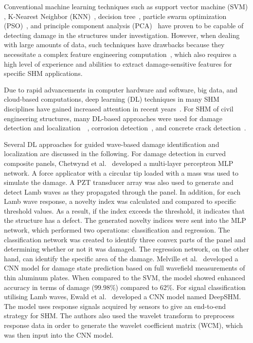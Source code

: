 \documentclass[runningheads]{llncs}
\begin{document}
Conventional machine learning techniques such as support vector machine (SVM) \cite{noori2010application}, K-Nearest Neighbor (KNN)~\cite{Vitola2017}, decision tree~\cite{Mariniello2020}, particle swarm optimization (PSO)~\cite{Khatir2018}, and principle component analysis (PCA)~\cite{wang2014principal} have proven to be capable of detecting damage in the structures under investigation.
However, when dealing with large amounts of data, such techniques have drawbacks because they necessitate a complex feature engineering computation~\cite{Gulgec2019}, which also requires a high level of experience and abilities to extract damage-sensitive features for specific SHM applications.

Due to rapid advancements in computer hardware and software, big data, and cloud-based computations, deep learning (DL) techniques in many SHM disciplines have gained increased attention in recent years~\cite{Azimi}.
For SHM of civil engineering structures, many DL-based approaches were used for damage detection and localization~\cite{Cha2018}~\cite{Kong2018}, corrosion detection~\cite{Atha2018}, and concrete crack detection~\cite{Dung2019}.

Several DL approaches for guided wave-based damage identification and localization are discussed in the following.
For damage detection in curved composite panels, Chetwynd et al.~\cite{Chetwynd2008} developed a multi-layer perceptron MLP network.
A force applicator with a circular tip loaded with a mass was used to simulate the damage.
A PZT transducer array was also used to generate and detect Lamb waves as they propagated through the panel.
In addition, for each Lamb wave response, a novelty index was calculated and compared to specific threshold values.
As a result, if the index exceeds the threshold, it indicates that the structure has a defect.
The generated novelty indices were sent into the MLP network, which performed two operations: classification and regression.
The classification network was created to identify three convex parts of the panel and determining whether or not it was damaged.
The regression network, on the other hand, can identify the specific area of the damage.
Melville et al.~\cite{Melville2018} developed a CNN model for damage state prediction based on full wavefield measurements of thin aluminum plates.
When compared to the SVM, the model showed enhanced accuracy in terms of damage (\(99.98\%\)) compared to \(62\%\).
For signal classification utilising Lamb waves, Ewald et al.~\cite{Ewald2019} developed a CNN model named DeepSHM.
The model uses response signals acquired by sensors to give an end-to-end strategy for SHM.
The authors also used the wavelet transform to preprocess response data in order to generate the wavelet coefficient matrix (WCM), which was then input into the CNN model.
\end{document}
